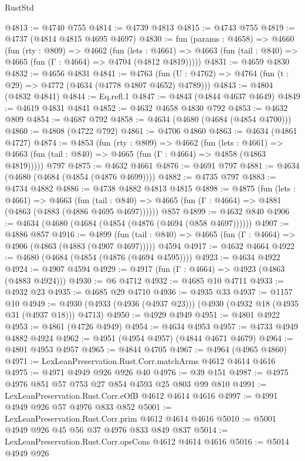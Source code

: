\begin{lexlean}{RustStd}
\begin{coremodule}
{\begin{coremodule}
{{{{{@4813 := @4740 @755
@4814 := @4739 @4813
@4815 := @4743 @755
@4819 := @4737 (@4814 @4815 @4695 @4697)
@4830 := fun (params : @4658) =>
  @4660
    (fun (rty : @809) =>
    @4662
      (fun (lets : @4661) =>
      @4663 (fun (tail : @840) => @4665 (fun (Γ : @4664) => @4704 (@4812 @4819)))))
@4831 := @4659 @4830
@4832 := @4656 @4831
@4841 := @4763 (fun (U : @4762) => @4764 (fun (t : @29) => @4772 (@4634 (@4778 @4807 @4652) @4789)))
@4843 := @4804 (@4832 @4841)
@4844 := Eq.refl.{1}
@4847 := @4843 (@4844 @4637 @4649)
@4849 := @4619 @4831 @4841
@4852 := @4632 @4658 @4830 @792
@4853 := @4632 @809
@4854 := @4687 @792
@4858 := @4634 (@4680 (@4684 (@4854 @4700)))
@4860 := @4808 (@4722 @792)
@4861 := @4706 @4860
@4863 := @4634 (@4861 @4727)
@4874 := @4853
    (fun (rty : @809) =>
    @4662
      (fun (lets : @4661) =>
      @4663 (fun (tail : @840) => @4665 (fun (Γ : @4664) => @4858 (@4863 @4819)))))
    @797
@4875 := @4632 @4661
@4876 := @4691 @797
@4881 := @4634 (@4680 (@4684 (@4854 (@4876 @4699))))
@4882 := @4735 @797
@4883 := @4734 @4882
@4886 := @4738 @4882 @4813 @4815
@4898 := @4875
    (fun (lets : @4661) =>
    @4663
      (fun (tail : @840) => @4665 (fun (Γ : @4664) => @4881 (@4863 (@4883 (@4886 @4695 @4697))))))
    @857
@4899 := @4632 @840
@4906 := @4634 (@4680 (@4684 (@4854 (@4876 (@4694 (@858 @4697))))))
@4907 := @4886 @857
@4916 := @4899
    (fun (tail : @840) => @4665 (fun (Γ : @4664) => @4906 (@4863 (@4883 (@4907 @4697)))))
    @4594
@4917 := @4632 @4664
@4922 := @4680 (@4684 (@4854 (@4876 (@4694 @4595))))
@4923 := @4634 @4922
@4924 := @4907 @4594
@4929 := @4917 (fun (Γ : @4664) => @4923 (@4863 (@4883 @4924)))
@4930 := @6 @4712
@4932 := @4685 @10 @4711
@4933 := @4932 @23
@4935 := @4685 @29 @4710
@4936 := @4935 @33
@4937 := @1157 @10
@4949 := @4930 (@4933 (@4936 (@4937 @23))) (@4930 (@4932 @18 (@4935 @31 (@4937 @18))) @4713)
@4950 := @4929 @4949
@4951 := @4801 @4922
@4953 := @4861 (@4726 @4949)
@4954 := @4634 @4953
@4957 := @4733 @4949 @4882 @4924
@4962 := @4951 (@4954 @4957) (@4844 @4671 @4679)
@4964 := @4801 @4953 @4957
@4965 := @4844 @4705
@4967 := @4964 (@4965 @4860)
@4971 := LexLeanPreservation.Rust.Corr.matchArms @4612 @4614 @4616
@4975 := @4971 @4949 @926 @926 @40
@4976 := @39 @151
@4987 := @4975 @4976 @851 @57 @753 @27 @854 @4593 @25 @803 @99 @810
@4991 := LexLeanPreservation.Rust.Corr.eOfB @4612 @4614 @4616
@4997 := @4991 @4949 @926 @57 @4976 @833 @852
@5001 := LexLeanPreservation.Rust.Corr.prim @4612 @4614 @4616
@5010 := @5001 @4949 @926 @45 @56 @37 @4976 @833 @849 @837
@5014 := LexLeanPreservation.Rust.Corr.opsCons @4612 @4614 @4616
@5016 := @5014 @4949 @926
}}}}}
\end{coremodule}}
\end{coremodule}
\end{lexlean}
